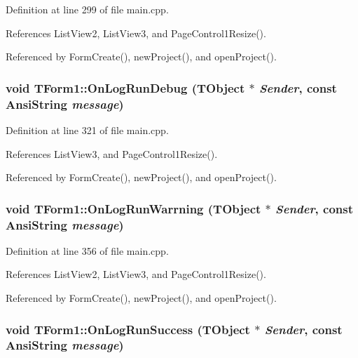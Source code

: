Definition at line 299 of file main.cpp.

References ListView2, ListView3, and PageControl1Resize().

Referenced by FormCreate(), newProject(), and openProject().\hypertarget{classTForm1_62c5ecb809ce9a5473816fb013f4260e}{
\subsubsection[OnLogRunDebug]{\setlength{\rightskip}{0pt plus 5cm}void TForm1::OnLogRunDebug (TObject $\ast$ {\em Sender}, \/  const AnsiString {\em message})}}
\label{classTForm1_62c5ecb809ce9a5473816fb013f4260e}




Definition at line 321 of file main.cpp.

References ListView3, and PageControl1Resize().

Referenced by FormCreate(), newProject(), and openProject().\hypertarget{classTForm1_807c0c99b2bbeb91113b83131309cecc}{
\subsubsection[OnLogRunWarrning]{\setlength{\rightskip}{0pt plus 5cm}void TForm1::OnLogRunWarrning (TObject $\ast$ {\em Sender}, \/  const AnsiString {\em message})}}
\label{classTForm1_807c0c99b2bbeb91113b83131309cecc}




Definition at line 356 of file main.cpp.

References ListView2, ListView3, and PageControl1Resize().

Referenced by FormCreate(), newProject(), and openProject().\hypertarget{classTForm1_9d4f79fae095cda30188324ad61a95a0}{
\subsubsection[OnLogRunSuccess]{\setlength{\rightskip}{0pt plus 5cm}void TForm1::OnLogRunSuccess (TObject $\ast$ {\em Sender}, \/  const AnsiString {\em message})}}
\label{classTForm1_9d4f79fae095cda30188324ad61a95a0}





